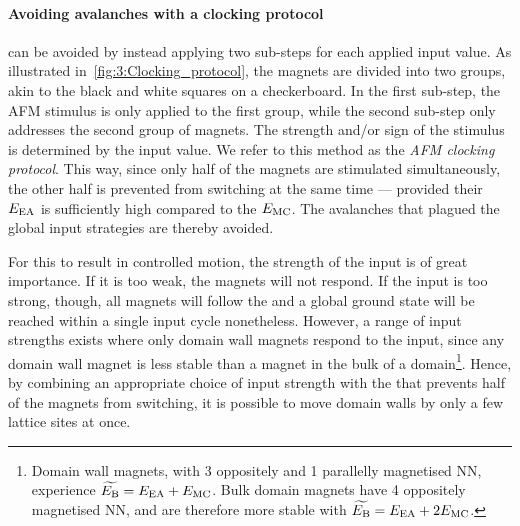 \paragraph{Avoiding avalanches with a clocking protocol}
 can be avoided by instead applying two sub-steps for each applied input value.
As illustrated in~\cref{fig:3:Clocking_protocol}, the magnets are divided into two groups, akin to the black and white squares on a checkerboard.
In the first sub-step, the AFM stimulus is only applied to the first group, while the second sub-step only addresses the second group of magnets.
The strength and/or sign of the stimulus is determined by the input value.
We refer to this method as the \emph{AFM clocking protocol}.
This way, since only half of the magnets are stimulated simultaneously, the other half is prevented from switching at the same time --- provided their  $E_\mathrm{EA}$ is sufficiently high compared to the $E_\mathrm{MC}$.
The avalanches that plagued the global input strategies are thereby avoided. \par
For this to result in controlled  motion, the strength of the input is of great importance.
If it is too weak, the magnets will not respond.
If the input is too strong, though, all magnets will follow the  and a global ground state will be reached within a single input cycle nonetheless.
However, a range of input strengths exists where only domain wall magnets respond to the input, since any domain wall magnet is less stable than a magnet in the bulk of a domain\footnote{
	Domain wall magnets, with 3 oppositely and 1 parallelly magnetised NN, experience $\widetilde{E_\mathrm{B}} = E_\mathrm{EA} + E_\mathrm{MC}$.
	Bulk domain magnets have 4 oppositely magnetised NN, and are therefore more stable with $\widetilde{E_\mathrm{B}} = E_\mathrm{EA} + 2E_\mathrm{MC}$.
}.
Hence, by combining an appropriate choice of input strength with the  that prevents half of the magnets from switching, it is possible to move domain walls by only a few lattice sites at once. %


